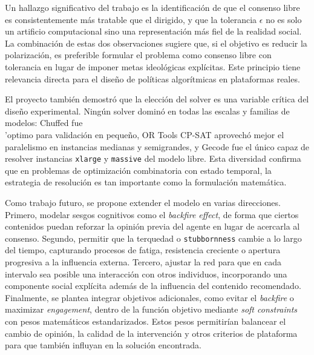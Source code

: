\documentclass[10pt,letterpaper]{article}
\begin{document}
Un hallazgo significativo del trabajo es la identificaci\'on de que el consenso libre es consistentemente m\'as tratable que el dirigido, y que la tolerancia \(\epsilon\) no es solo un artificio computacional sino una representaci\'on m\'as fiel de la realidad social. La combinaci\'on de estas dos observaciones sugiere que, si el objetivo es reducir la polarizaci\'on, es preferible formular el problema como consenso libre con tolerancia en lugar de imponer metas ideol\'ogicas expl\'icitas. Este principio tiene relevancia directa para el dise\~no de pol\'iticas algor\'itmicas en plataformas reales.

El proyecto tambi\'en demostr\'o que la elecci\'on del solver es una variable cr\'itica del dise\~no experimental. Ning\'un solver domin\'o en todas las escalas y familias de modelos: Chuffed fue \\'optimo para validaci\'on en peque\~no, OR Tools CP-SAT aprovech\'o mejor el paralelismo en instancias medianas y semigrandes, y Gecode fue el \'unico capaz de resolver instancias \texttt{xlarge} y \texttt{massive} del modelo libre. Esta diversidad confirma que en problemas de optimizaci\'on combinatoria con estado temporal, la estrategia de resoluci\'on es tan importante como la formulaci\'on matem\'atica.

Como trabajo futuro, se propone extender el modelo en varias direcciones. Primero, modelar sesgos cognitivos como el \textit{backfire effect}, de forma que ciertos contenidos puedan reforzar la opini\'on previa del agente en lugar de acercarla al consenso. Segundo, permitir que la terquedad o \texttt{stubbornness} cambie a lo largo del tiempo, capturando procesos de fatiga, resistencia creciente o apertura progresiva a la influencia externa. Tercero, ajustar la red para que en cada intervalo sea posible una interacci\'on con otros individuos, incorporando una componente social expl\'icita adem\'as de la influencia del contenido recomendado. Finalmente, se plantea integrar objetivos adicionales, como evitar el \textit{backfire} o maximizar \textit{engagement}, dentro de la funci\'on objetivo mediante \textit{soft constraints} con pesos matem\'aticos estandarizados. Estos pesos permitir\'ian balancear el cambio de opini\'on, la calidad de la intervenci\'on y otros criterios de plataforma para que tambi\'en influyan en la soluci\'on encontrada.




\end{document}
